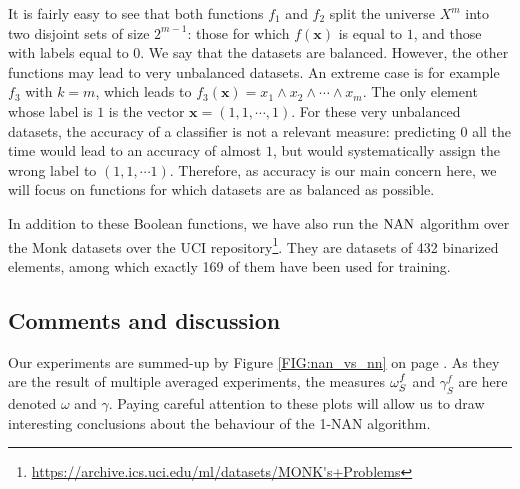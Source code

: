 It is fairly easy to see that both functions $f_1$ and $f_2$ split the universe $X^m$ into
two disjoint sets of size $2^{m - 1}$: those for which $f(\mathbf{x})$ is
equal to $1$, and those with labels equal to $0$. We say that the datasets are
balanced. However, the other functions may lead to very unbalanced datasets. An
extreme case is for example $f_3$ with $k = m$, which leads to $f_3(\mathbf{x})
= x_1 \wedge x_2 \wedge \cdots \wedge x_m$. The only element whose label is $1$
is the vector $\mathbf{x} = (1, 1, \cdots, 1)$. For these very unbalanced
datasets, the accuracy of a classifier is not a relevant measure: predicting
$0$ all the time would lead to an accuracy of almost $1$, but would
systematically assign the wrong label to   $(1, 1, \cdots 1)$. Therefore, as
accuracy is our main concern here, we will focus on functions for which
datasets are as balanced as possible.

In addition to these Boolean functions, we have also run the $\mbox{NAN}$ algorithm
over the Monk datasets over the UCI
repository\footnote{\url{https://archive.ics.uci.edu/ml/datasets/MONK's+Problems}}.
They are datasets of 432 binarized elements, among which exactly 169 of them
have been used for training.

\subsection{Comments and discussion}

Our experiments are summed-up by Figure \ref{FIG:nan_vs_nn} on page
\pageref{FIG:nan_vs_nn}. As they are the result of multiple averaged
experiments, the measures $\omega_{S}^{f}$ and $\gamma_S^f$ are here denoted $\omega$
and $\gamma$. Paying careful attention to these plots will allow us to draw
interesting conclusions about the behaviour of the 1-NAN algorithm.

